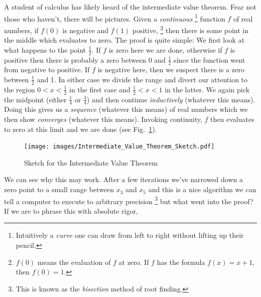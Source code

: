     \begin{example}
        \label{ex:Logic_IVP}%
        A student of calculus has likely heard of the intermediate value
        theorem. Fear not those who haven't,
        there will be pictures. Given a \textit{continuous}%
        \footnote{%
            Intuitively a \textit{curve} one can draw from left to right without
            lifting up their pencil.%
        }
        function $f$ of real numbers, if $f(0)$ is negative and $f(1)$
        positive,%
        \footnote{%
            $f(0)$ means the evaluation of $f$ at zero. If $f$ has the formula
            $f(x)=x+1$, then $f(0)=1$.
        }
        then there is some point in the middle which evaluates to zero. The
        proof is quite simple: We first look at what happens to the point
        $\frac{1}{2}$. If $f$ is zero here we are done, otherwise if $f$ is
        positive then there is probably a zero between 0 and $\frac{1}{2}$
        since the function went from negative to positive. If $f$ is negative
        here, then we suspect there is a zero between $\frac{1}{2}$ and 1. In
        either case we divide the range and divert our attention to the region
        $0<x<\frac{1}{2}$ in the first case and $\frac{1}{2}<x<1$ in the latter.
        We again pick the midpoint (either $\frac{1}{4}$ or $\frac{3}{4}$) and
        then continue \textit{inductively} (whatever this means). Doing this
        gives us a \textit{sequence} (whatever this means) of real numbers which
        we then show \textit{converges} (whatever this means). Invoking
        continuity, $f$ then evaluates to zero at this limit and we are done
        (see Fig.~\ref{fig:Sketch_of_IVP}).
    \end{example}
    \begin{figure}[H]
        \centering
        \captionsetup{type=figure}
        \if{}
            \texttt{[image: images/Intermediate\_Value\_Theorem\_Sketch.pdf]}
        \fi
        \caption{Sketch for the Intermediate Value Theorem}
        \label{fig:Sketch_of_IVP}
    \end{figure}
    We can see why this may work. After a few iterations we've narrowed down a
    zero point to a small range between $x_{3}$ and $x_{5}$ and this is a
    nice algorithm we can tell a computer to execute to arbitrary precision%
    \footnote{%
        This is known as the \textit{bisection} method%
         of root finding.%
    }
    but what went into the proof? If we are to phrase this with absolute rigor,
